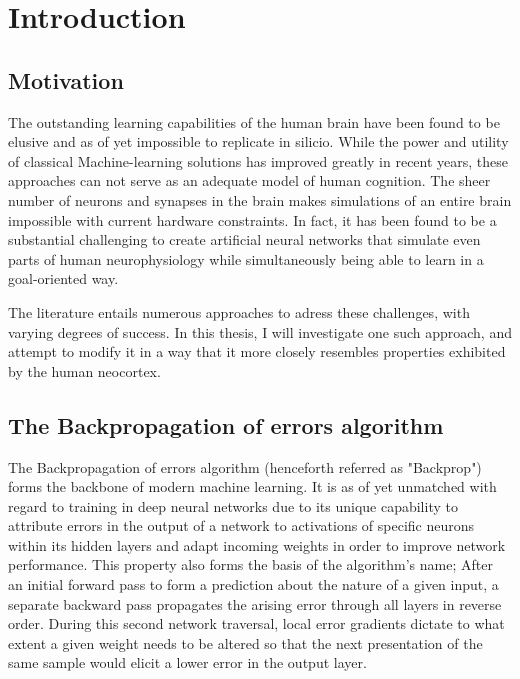 
\chapter{Introduction}



\section{Motivation}


The outstanding learning capabilities of the human brain have been found to be elusive and as of yet impossible to
replicate in silicio. While the power and utility of classical Machine-learning solutions has improved greatly in recent
years, these approaches can not serve as an adequate model of human cognition. The sheer number of neurons and synapses
in the brain makes simulations of an entire brain impossible with current hardware constraints. In fact, it has been
found to be a substantial challenging to create artificial neural networks that simulate even parts of human
neurophysiology while simultaneously being able to learn in a goal-oriented way.



The literature entails numerous approaches to adress these challenges, with varying degrees of success. In this thesis,
I will investigate one such approach, and attempt to modify it in a way that it more closely resembles properties
exhibited by the human neocortex.




\section{The Backpropagation of errors algorithm}

The Backpropagation of errors algorithm (henceforth referred as "Backprop") forms the backbone of modern machine
learning. \citeme It is as of yet unmatched with regard to training in deep neural networks due to its unique capability
to attribute errors in the output of a network to activations of specific neurons within its hidden layers and adapt
incoming weights in order to improve network performance. This property also forms the basis of the algorithm's name;
After an initial forward pass to form a prediction about the nature of a given input, a separate backward pass
propagates the arising error through all layers in reverse order. During this second network traversal, local error
gradients dictate to what extent a given weight needs to be altered so that the next presentation of the same sample
would elicit a lower error in the output layer.


